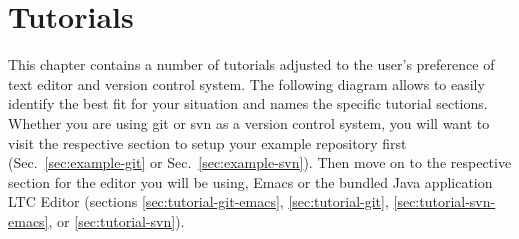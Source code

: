 \chapter{Tutorials} \label{ch:tutorials}

This chapter contains a number of tutorials adjusted to the user's preference of text editor and version control system.  The following diagram allows to easily identify the best fit for your situation and names the specific tutorial sections.  Whether you are using git or svn as a version control system, you will want to visit the respective section to setup your example repository first (Sec.~\ref{sec:example-git} or Sec.~\ref{sec:example-svn}).  Then move on to the respective section for the editor you will be using, Emacs or the bundled Java application LTC Editor (sections \ref{sec:tutorial-git-emacs}, \ref{sec:tutorial-git}, \ref{sec:tutorial-svn-emacs}, or \ref{sec:tutorial-svn}).

